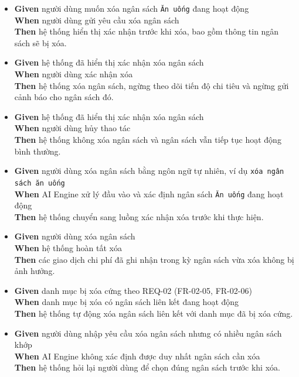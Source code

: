 \begin{itemize}
\item \textbf{Given} người dùng muốn xóa ngân sách \texttt{Ăn uống} đang hoạt động  \\ \hspace*{1.5em}  \textbf{When} người dùng gửi yêu cầu xóa ngân sách  \\ \hspace*{1.5em}  \textbf{Then} hệ thống hiển thị xác nhận trước khi xóa, bao gồm thông tin ngân sách sẽ bị xóa.
\item \textbf{Given} hệ thống đã hiển thị xác nhận xóa ngân sách  \\ \hspace*{1.5em}  \textbf{When} người dùng xác nhận xóa  \\ \hspace*{1.5em}  \textbf{Then} hệ thống xóa ngân sách, ngừng theo dõi tiến độ chi tiêu và ngừng gửi cảnh báo cho ngân sách đó.
\item \textbf{Given} hệ thống đã hiển thị xác nhận xóa ngân sách  \\ \hspace*{1.5em}  \textbf{When} người dùng hủy thao tác  \\ \hspace*{1.5em}  \textbf{Then} hệ thống không xóa ngân sách và ngân sách vẫn tiếp tục hoạt động bình thường.
\item \textbf{Given} người dùng xóa ngân sách bằng ngôn ngữ tự nhiên, ví dụ \texttt{xóa ngân sách ăn uống}  \\ \hspace*{1.5em}  \textbf{When} AI Engine xử lý đầu vào và xác định ngân sách \texttt{Ăn uống} đang hoạt động  \\ \hspace*{1.5em}  \textbf{Then} hệ thống chuyển sang luồng xác nhận xóa trước khi thực hiện.
\item \textbf{Given} người dùng xóa ngân sách  \\ \hspace*{1.5em}  \textbf{When} hệ thống hoàn tất xóa  \\ \hspace*{1.5em}  \textbf{Then} các giao dịch chi phí đã ghi nhận trong kỳ ngân sách vừa xóa không bị ảnh hưởng.
\item \textbf{Given} danh mục bị xóa cứng theo REQ-02 (FR-02-05, FR-02-06)  \\ \hspace*{1.5em}  \textbf{When} danh mục bị xóa có ngân sách liên kết đang hoạt động  \\ \hspace*{1.5em}  \textbf{Then} hệ thống tự động xóa ngân sách liên kết với danh mục đã bị xóa cứng.
\item \textbf{Given} người dùng nhập yêu cầu xóa ngân sách nhưng có nhiều ngân sách khớp  \\ \hspace*{1.5em}  \textbf{When} AI Engine không xác định được duy nhất ngân sách cần xóa  \\ \hspace*{1.5em}  \textbf{Then} hệ thống hỏi lại người dùng để chọn đúng ngân sách trước khi xóa.
\end{itemize}
